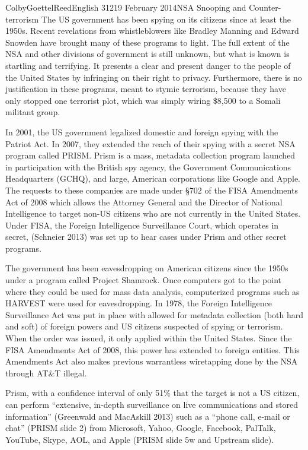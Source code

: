 \documentclass[12pt]{article}
\begin{document}
\begin{mla}{Colby}{Goettel}{Reed}{English 312}{19 February 2014}{NSA Snooping and Counter-terrorism}
The US government has been spying on its citizens since at least the 1950s. Recent revelations from whistleblowers like Bradley Manning and Edward Snowden have brought many of these programs to light. The full extent of the NSA and other divisions of government is still unknown, but what is known is startling and terrifying. It presents a clear and present danger to the people of the United States by infringing on their right to privacy. Furthermore, there is no justification in these programs, meant to stymie terrorism, because they have only stopped one terrorist plot, which was simply wiring \$8,500 to a Somali militant group.

In 2001, the US government legalized domestic and foreign spying with the Patriot Act. In 2007, they extended the reach of their spying with a secret NSA program called PRISM. Prism is a mass, metadata collection program launched in participation with the British spy agency, the Government Communications Headquarters (GCHQ), and large, American corporations like Google and Apple. The requests to these companies are made under \S702 of the FISA Amendments Act of 2008 which allows the Attorney General and the Director of National Intelligence to target non-US citizens who are not currently in the United States. Under FISA, the Foreign Intelligence Surveillance Court, which operates in secret, (Schneier 2013) was set up to hear cases under Prism and other secret programs.

The government has been eavesdropping on American citizens since the 1950s under a program called Project Shamrock. Once computers got to the point where they could be used for mass data analysis, computerized programs such as HARVEST were used for eavesdropping. In 1978, the Foreign Intelligence Surveillance Act was put in place with allowed for metadata collection (both hard and soft) of foreign powers and US citizens suspected of spying or terrorism. When the order was issued, it only applied within the United States. Since the FISA Amendments Act of 2008, this power has extended to foreign entities. This Amendments Act also makes previous warrantless wiretapping done by the NSA through AT\&T illegal.

Prism, with a confidence interval of only 51\% that the target is not a US citizen, can perform ``extensive, in-depth surveillance on live communications and stored information'' (Greenwald and MacAskill 2013) such as a ``phone call, e-mail or chat'' (PRISM slide 2) from Microsoft, Yahoo, Google, Facebook, PalTalk, YouTube, Skype, AOL, and Apple (PRISM slide 5w and Upstream slide).


\end{mla}
\end{document}
